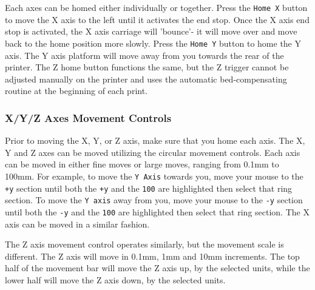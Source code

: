 Each axes can be homed either individually or together. Press the \texttt{Home X} button to move the X axis to the left until it activates the end stop. Once the X axis end stop is activated, the X axis carriage will 'bounce'- it will move over and move back to the home position more slowly. Press the \texttt{Home Y} button to home the Y axis. The Y axis platform will move away from you towards the rear of the printer. The Z home button functions the same, but the Z trigger cannot be adjusted manually on the printer and uses the automatic bed-compensating routine at the beginning of each print.

\subsubsection{X/Y/Z Axes Movement Controls}
Prior to moving the X, Y, or Z axis, make sure that you home each axis. The X, Y and Z axes can be moved utilizing the circular movement controls. Each axis can be moved in either fine moves or large moves, ranging from 0.1mm to 100mm.  For example, to move the \texttt{Y Axis} towards you, move your mouse to the \texttt{+y} section until both the \texttt{+y} and the \texttt{100} are highlighted then select that ring section. To move the \texttt{Y axis} away from you, move your mouse to the \texttt{-y} section until both the \texttt{-y} and the \texttt{100} are highlighted then select that ring section. The X axis can be moved in a similar fashion.

The Z axis movement control operates similarly, but the movement scale is different. The Z axis will move in 0.1mm, 1mm and 10mm increments. The top half of the movement bar will move the Z axis up, by the selected units, while the lower half will move the Z axis down, by the selected units. 





